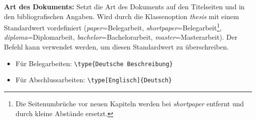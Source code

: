 	\textbf{Art des Dokuments:}\label{cmd:type}
	Setzt die Art des Dokuments auf den Titelseiten und in den bibliografischen Angaben.
	Wird durch die Klassenoption \textit{thesis} mit einem Standardwert vordefiniert (\textit{paper}=Belegarbeit, \textit{shortpaper}=Belegarbeit\footnote{Die Seitenumbrüche vor neuen Kapiteln werden bei \textit{shortpaper} entfernt und durch kleine Abstände ersetzt.}, \textit{diploma}=Diplomarbeit, \textit{bachelor}=Bachelorarbeit, \textit{master}=Masterarbeit).
	Der Befehl kann verwendet werden, um diesen Standardwert zu überschreiben.
	\begin{itemize}
		\item Für Belegarbeiten: \verb|\type{Deutsche Beschreibung}|
		\item Für Abschlussarbeiten: \verb|\type[Englisch]{Deutsch}|
	\end{itemize}
	
